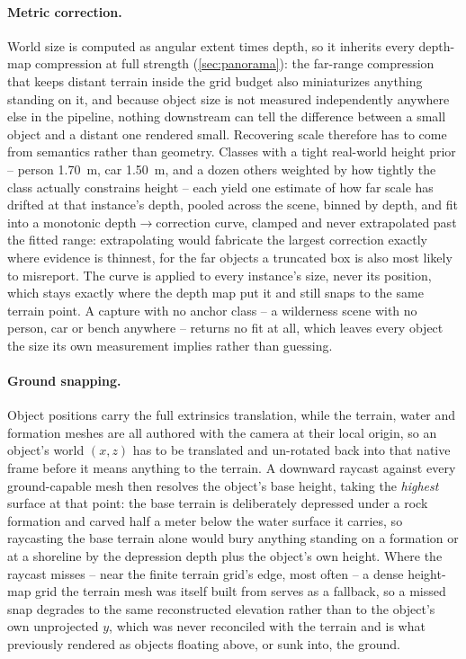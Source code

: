\paragraph{Metric correction.} World size is computed as angular extent times
depth, so it inherits every depth-map compression at full strength
(\cref{sec:panorama}): the far-range compression that keeps distant terrain inside
the grid budget also miniaturizes anything standing on it, and because object size
is not measured independently anywhere else in the pipeline, nothing downstream can
tell the difference between a small object and a distant one rendered small.
Recovering scale therefore has to come from semantics rather than geometry. Classes
with a tight real-world height prior -- person \SI{1.70}{\meter}, car
\SI{1.50}{\meter}, and a dozen others weighted by how tightly the class actually
constrains height -- each yield one estimate of how far scale has drifted at that
instance's depth, pooled across the scene, binned by depth, and fit into a
monotonic depth$\to$correction curve, clamped and never extrapolated past the
fitted range: extrapolating would fabricate the largest correction exactly where
evidence is thinnest, for the far objects a truncated box is also most likely to
misreport. The curve is applied to every instance's size, never its position, which
stays exactly where the depth map put it and still snaps to the same terrain point.
A capture with no anchor class -- a wilderness scene with no person, car or bench
anywhere -- returns no fit at all, which leaves every object the size its own
measurement implies rather than guessing.

\paragraph{Ground snapping.} Object positions carry the full extrinsics
translation, while the terrain, water and formation meshes are all authored with
the camera at their local origin, so an object's world $(x, z)$ has to be
translated and un-rotated back into that native frame before it means anything to
the terrain. A downward raycast against every ground-capable mesh then resolves the
object's base height, taking the \emph{highest} surface at that point: the base
terrain is deliberately depressed under a rock formation and carved half a meter
below the water surface it carries, so raycasting the base terrain alone would bury
anything standing on a formation or at a shoreline by the depression depth plus the
object's own height. Where the raycast misses -- near the finite terrain grid's
edge, most often -- a dense height-map grid the terrain mesh was itself built from
serves as a fallback, so a missed snap degrades to the same reconstructed elevation
rather than to the object's own unprojected $y$, which was never reconciled with
the terrain and is what previously rendered as objects floating above, or sunk
into, the ground.

